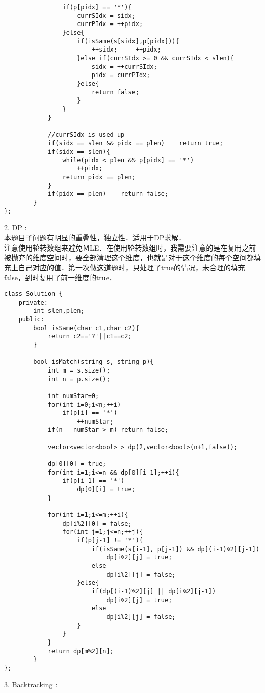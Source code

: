 \begin{description}
\begin{lstlisting}
				if(p[pidx] == '*'){
					currSIdx = sidx;
					currPIdx = ++pidx; 
				}else{
					if(isSame(s[sidx],p[pidx])){
						++sidx;		++pidx;
					}else if(currSIdx >= 0 && currSIdx < slen){
						sidx = ++currSIdx;
						pidx = currPIdx;
					}else{
						return false;
					}
				}
			}

			//currSIdx is used-up
			if(sidx == slen && pidx == plen)	return true;
			if(sidx == slen){
				while(pidx < plen && p[pidx] == '*')
					++pidx;
				return pidx == plen;
			}
			if(pidx == plen)	return false;
		}
};
		\end{lstlisting}
	\item{2. DP} : \\
		本题目子问题有明显的重叠性，独立性．适用于DP求解．\\
		注意使用轮转数组来避免ＭLE．在使用轮转数组时，我需要注意的是在复用之前被抛弃的维度空间时，要全部清理这个维度，也就是对于这个维度的每个空间都填充上自己对应的值．第一次做这道题时，只处理了true的情况，未合理的填充false，到时复用了前一维度的true．

		\begin{lstlisting}
class Solution {
	private:
		int slen,plen;
	public:
		bool isSame(char c1,char c2){
			return c2=='?'||c1==c2;
		}

		bool isMatch(string s, string p){
			int m = s.size();
			int n = p.size();

			int numStar=0;
			for(int i=0;i<n;++i)
				if(p[i] == '*')
					++numStar;
			if(n - numStar > m)	return false;

			vector<vector<bool> > dp(2,vector<bool>(n+1,false));

			dp[0][0] = true;
			for(int i=1;i<=n && dp[0][i-1];++i){
				if(p[i-1] == '*')
					dp[0][i] = true;
			}

			for(int i=1;i<=m;++i){
				dp[i%2][0] = false;
				for(int j=1;j<=n;++j){
					if(p[j-1] != '*'){
						if(isSame(s[i-1], p[j-1]) && dp[(i-1)%2][j-1])
							dp[i%2][j] = true;
						else
							dp[i%2][j] = false;
					}else{
						if(dp[(i-1)%2][j] || dp[i%2][j-1])
							dp[i%2][j] = true;
						else
							dp[i%2][j] = false;
					}
				}
			}
			return dp[m%2][n];
		}
};
		\end{lstlisting}

	\item{3. Backtracking} : \\
    \begin{lstlisting}
    \end{lstlisting}
\end{description}

